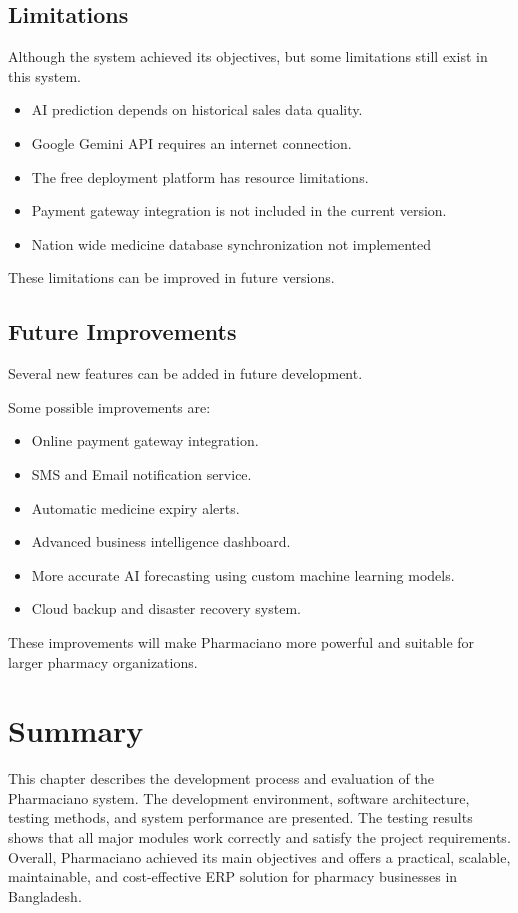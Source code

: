 \subsection{Limitations}
Although the system achieved its objectives, but some limitations still exist in this system.
\begin{itemize}
\item AI prediction depends on historical sales data quality.
\item Google Gemini API requires an internet connection.
\item The free deployment platform has resource limitations.
\item Payment gateway integration is not included in the current version.
\item Nation wide medicine database synchronization not implemented
\end{itemize}

These limitations can be improved in future versions.

\subsection{Future Improvements}
Several new features can be added in future development.

Some possible improvements are:
\begin{itemize}
\item Online payment gateway integration.
\item SMS and Email notification service.
\item Automatic medicine expiry alerts.
\item Advanced business intelligence dashboard.
\item More accurate AI forecasting using custom machine learning models.
\item Cloud backup and disaster recovery system.
\end{itemize}
These improvements will make Pharmaciano more powerful and suitable for larger pharmacy organizations.

\section{Summary}
This chapter describes the development process and evaluation of the Pharmaciano system. The development environment, software architecture, testing methods, and system performance  are presented. The testing results shows that all major modules work correctly and satisfy the project requirements.
Overall, Pharmaciano achieved its main objectives and offers a practical, scalable, maintainable, and cost-effective ERP solution for pharmacy businesses in Bangladesh.